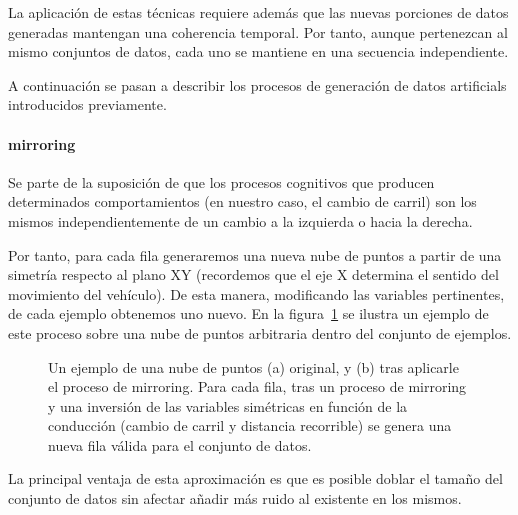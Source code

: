 La aplicación de estas técnicas requiere además que las nuevas porciones de datos generadas mantengan una coherencia temporal. Por tanto, aunque pertenezcan al mismo conjuntos de datos, cada uno se mantiene en una secuencia independiente.

A continuación se pasan a describir los procesos de generación de datos artificials introducidos previamente.

\paragraph{mirroring}

Se parte de la suposición de que los procesos cognitivos que producen determinados comportamientos (en nuestro caso, el cambio de carril) son los mismos independientemente de un cambio a la izquierda o hacia la derecha.

Por tanto, para cada fila generaremos una nueva nube de puntos a partir de una simetría respecto al plano XY (recordemos que el eje X determina el sentido del movimiento del vehículo). De esta manera, modificando las variables pertinentes, de cada ejemplo obtenemos uno nuevo. En la figura~\ref{fig:mirroring-example} se ilustra un ejemplo de este proceso sobre una nube de puntos arbitraria dentro del conjunto de ejemplos.

\begin{figure}
	\centering
	\qquad
	\caption[Ejemplo de la técnica de \textit{mirroring}]{Un ejemplo de una nube de puntos (a) original, y (b) tras aplicarle el proceso de mirroring. Para cada fila, tras un proceso de mirroring y una inversión de las variables simétricas en función de la conducción (cambio de carril y distancia recorrible) se genera una nueva fila válida para el conjunto de datos.}
	\label{fig:mirroring-example}
\end{figure}

La principal ventaja de esta aproximación es que es posible doblar el tamaño del conjunto de datos sin afectar añadir más ruido al existente en los mismos.

